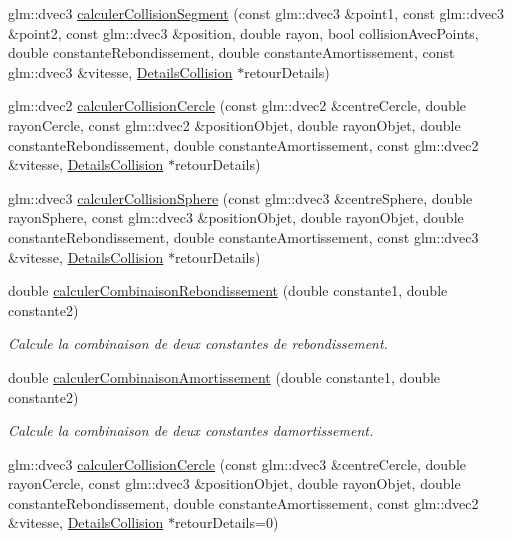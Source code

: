 \begin{DoxyCompactItemize}
\item 
glm\+::dvec3 \hyperlink{namespaceaidecollision_a660f93dd53870ae81cca5f3f5351fb1d}{calculer\+Collision\+Segment} (const glm\+::dvec3 \&point1, const glm\+::dvec3 \&point2, const glm\+::dvec3 \&position, double rayon, bool collision\+Avec\+Points, double constante\+Rebondissement, double constante\+Amortissement, const glm\+::dvec3 \&vitesse, \hyperlink{classaidecollision_1_1_details_collision}{Details\+Collision} $\ast$retour\+Details)
\item 
glm\+::dvec2 \hyperlink{namespaceaidecollision_a2235ca4efaa88b78e633e3cc20a46ed1}{calculer\+Collision\+Cercle} (const glm\+::dvec2 \&centre\+Cercle, double rayon\+Cercle, const glm\+::dvec2 \&position\+Objet, double rayon\+Objet, double constante\+Rebondissement, double constante\+Amortissement, const glm\+::dvec2 \&vitesse, \hyperlink{classaidecollision_1_1_details_collision}{Details\+Collision} $\ast$retour\+Details)
\item 
glm\+::dvec3 \hyperlink{namespaceaidecollision_a8a4a626b26cfebe552797993020d7abd}{calculer\+Collision\+Sphere} (const glm\+::dvec3 \&centre\+Sphere, double rayon\+Sphere, const glm\+::dvec3 \&position\+Objet, double rayon\+Objet, double constante\+Rebondissement, double constante\+Amortissement, const glm\+::dvec3 \&vitesse, \hyperlink{classaidecollision_1_1_details_collision}{Details\+Collision} $\ast$retour\+Details)
\item 
double \hyperlink{namespaceaidecollision_a6237077a29518539015295311e39e2cc}{calculer\+Combinaison\+Rebondissement} (double constante1, double constante2)
\begin{DoxyCompactList}\small\item\em Calcule la combinaison de deux constantes de rebondissement. \end{DoxyCompactList}\item 
double \hyperlink{namespaceaidecollision_a617db5046c54f02f5bfa501aadc368d8}{calculer\+Combinaison\+Amortissement} (double constante1, double constante2)
\begin{DoxyCompactList}\small\item\em Calcule la combinaison de deux constantes d\textquotesingle{}amortissement. \end{DoxyCompactList}\item 
glm\+::dvec3 \hyperlink{namespaceaidecollision_acd095fc8bdec705478c33480be8516f5}{calculer\+Collision\+Cercle} (const glm\+::dvec3 \&centre\+Cercle, double rayon\+Cercle, const glm\+::dvec3 \&position\+Objet, double rayon\+Objet, double constante\+Rebondissement, double constante\+Amortissement, const glm\+::dvec2 \&vitesse, \hyperlink{classaidecollision_1_1_details_collision}{Details\+Collision} $\ast$retour\+Details=0)
\end{DoxyCompactItemize}


